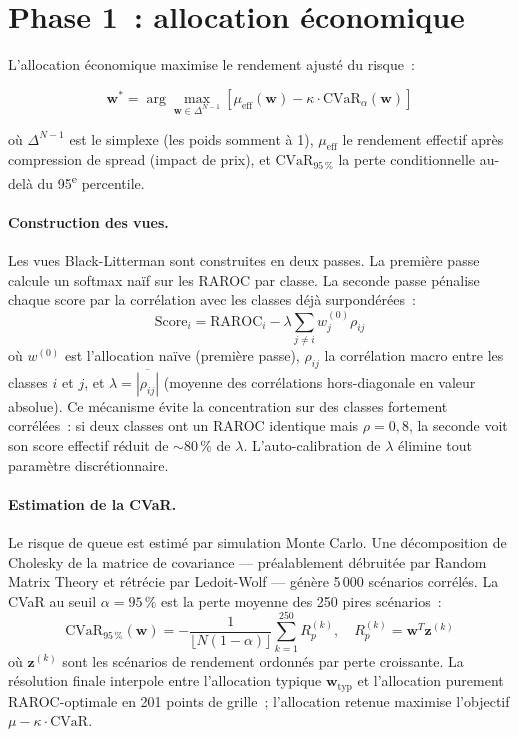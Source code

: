 \documentclass[10pt, a4paper, oneside]{report}
\theoremstyle{definition}
\begin{document}
\section{Phase 1~: allocation économique}
\label{sec:ch4:phase1}

L'allocation économique maximise le rendement ajusté du risque~:

\begin{equation}
\mathbf{w}^* = \arg\max_{\mathbf{w} \in \Delta^{N-1}} \left[ \mu_{\text{eff}}(\mathbf{w}) - \kappa \cdot \text{CVaR}_\alpha(\mathbf{w}) \right]
\label{eq:blcvar-obj}
\end{equation}

\noindent où $\Delta^{N-1}$ est le simplexe (les poids somment à 1), $\mu_{\text{eff}}$ le rendement effectif après compression de spread (impact de prix), et $\text{CVaR}_{95\,\%}$ la perte conditionnelle au-delà du 95\textsuperscript{e} percentile.

\paragraph{Construction des vues.} Les vues Black-Litterman sont construites en deux passes. La première passe calcule un softmax naïf sur les RAROC par classe. La seconde passe pénalise chaque score par la corrélation avec les classes déjà surpondérées~:
%
\begin{equation}
\text{Score}_i = \text{RAROC}_i - \lambda \sum_{j \neq i} w_j^{(0)} \rho_{ij}
\label{eq:score-penalise}
\end{equation}
%
\noindent où $w^{(0)}$ est l'allocation naïve (première passe), $\rho_{ij}$ la corrélation macro entre les classes $i$ et $j$, et $\lambda = \overline{|\rho_{ij}|}$ (moyenne des corrélations hors-diagonale en valeur absolue). Ce mécanisme évite la concentration sur des classes fortement corrélées~: si deux classes ont un RAROC identique mais $\rho = 0{,}8$, la seconde voit son score effectif réduit de $\sim$80\,\% de $\lambda$. L'auto-calibration de $\lambda$ élimine tout paramètre discrétionnaire.

\paragraph{Estimation de la CVaR.} Le risque de queue est estimé par simulation Monte Carlo. Une décomposition de Cholesky de la matrice de covariance --- préalablement débruitée par Random Matrix Theory \citep{laloux_potters_bouchaud1999} et rétrécie par Ledoit-Wolf --- génère 5\,000 scénarios corrélés. La CVaR au seuil $\alpha = 95\,\%$ est la perte moyenne des 250 pires scénarios~:
%
\begin{equation}
\text{CVaR}_{95\,\%}(\mathbf{w}) = -\frac{1}{\lfloor N(1-\alpha) \rfloor} \sum_{k=1}^{250} R_p^{(k)}, \quad R_p^{(k)} = \mathbf{w}^T \mathbf{z}^{(k)}
\label{eq:cvar-mc-phase1}
\end{equation}
%
\noindent où $\mathbf{z}^{(k)}$ sont les scénarios de rendement ordonnés par perte croissante. La résolution finale interpole entre l'allocation typique $\mathbf{w}_{\text{typ}}$ et l'allocation purement RAROC-optimale en 201 points de grille~; l'allocation retenue maximise l'objectif $\mu - \kappa \cdot \text{CVaR}$.
\end{document}
